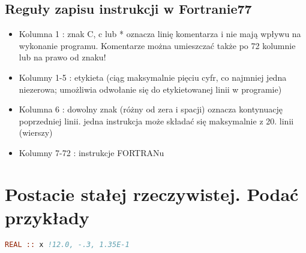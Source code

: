 \subsection{Reguły zapisu instrukcji w Fortranie77}
\begin{itemize}
\item Kolumna 1 : znak C, c lub * oznacza linię komentarza i nie mają
wpływu na wykonanie programu. Komentarze można
umieszczać także po 72 kolumnie lub na prawo od znaku!
\item Kolumny 1-5 : etykieta (ciąg maksymalnie pięciu cyfr, co najmniej
jedna niezerowa; umożliwia odwołanie się do etykietowanej
linii w programie)
\item Kolumna 6 : dowolny znak (różny od zera i spacji) oznacza
kontynuację poprzedniej linii. jedna instrukcja może składać
się maksymalnie z 20. linii (wierszy)
\item Kolumny 7-72 : instrukcje FORTRANu
\end{itemize}

\section{Postacie stałej rzeczywistej. Podać przykłady}
\begin{lstlisting}[language=Fortran, caption=dyrektywa implicit]
REAL :: x !12.0, -.3, 1.35E-1
\end{lstlisting}